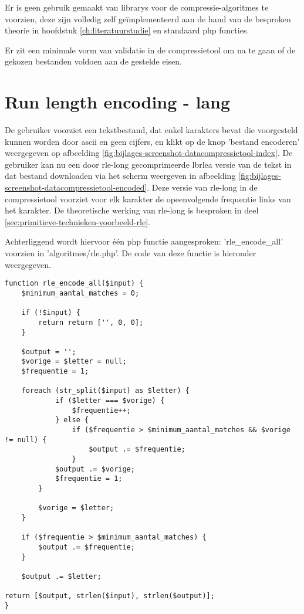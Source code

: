 Er is geen gebruik gemaakt van \glspl{library} voor de \glspl{compressie-algoritme} te voorzien, deze zijn volledig zelf geïmplementeerd aan de hand van de besproken theorie in hoofdstuk \ref{ch:literatuurstudie} en standaard \gls{php} functies.

Er zit een minimale vorm van validatie in de \gls{compressietool} om na te gaan of de gekozen bestanden voldoen aan de gestelde eisen.

\section{Run length encoding - lang}
\label{sec:compressietool-rlea}

De gebruiker voorziet een tekstbestand, dat enkel karakters bevat die voorgesteld kunnen worden door \gls{ascii} en geen cijfers, en klikt op de knop 'bestand encoderen' weergegeven op afbeelding \ref{fig:bijlages-screenshot-datacompressietool-index}. De gebruiker kan nu een door \gls{rle-long} gecomprimeerde \gls{lbrlea} versie van de tekst in dat bestand downloaden via het scherm weergeven in afbeelding \ref{fig:bijlages-screenshot-datacompressietool-encoded}. Deze versie van \gls{rle-long} in de \gls{compressietool} voorziet voor elk karakter de opeenvolgende frequentie links van het karakter. De theoretische werking van \gls{rle-long} is besproken in deel \ref{sec:primitieve-technieken-voorbeeld-rle}.

Achterliggend wordt hiervoor één \gls{php} functie aangesproken: 'rle\_encode\_all' voorzien in 'algoritmes/rle.php'. De code van deze functie is hieronder weergegeven.

\begin{lstlisting}
function rle_encode_all($input) {
	$minimum_aantal_matches = 0;
	
	if (!$input) {
		return return ['', 0, 0];
	}
	
	$output = '';
	$vorige = $letter = null;
	$frequentie = 1;
	
	foreach (str_split($input) as $letter) {
			if ($letter === $vorige) {
				$frequentie++;
			} else {
				if ($frequentie > $minimum_aantal_matches && $vorige != null) {
					$output .= $frequentie;
				}
			$output .= $vorige;
			$frequentie = 1;
		}
		
		$vorige = $letter;
	}
	
	if ($frequentie > $minimum_aantal_matches) {
		$output .= $frequentie;
	}
	
	$output .= $letter;

return [$output, strlen($input), strlen($output)];
}
\end{lstlisting}

